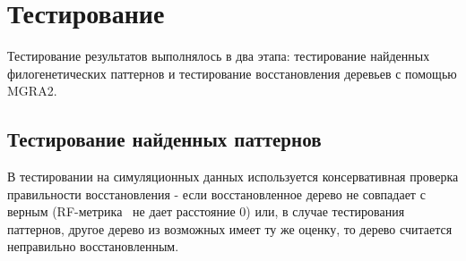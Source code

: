 \chapter{Тестирование}
Тестирование результатов выполнялось в два этапа: тестирование найденных филогенетических паттернов и тестирование
восстановления деревьев с помощью MGRA2.

\section{Тестирование найденных паттернов}
В тестировании на симуляционных данных используется консервативная проверка правильности восстановления -
если восстановленное дерево не совпадает с верным (RF-метрика~\cite{Robinson1981} не дает расстояние 0)
или, в случае тестирования паттернов, другое дерево из возможных имеет ту же оценку, то дерево считается неправильно восстановленным.

